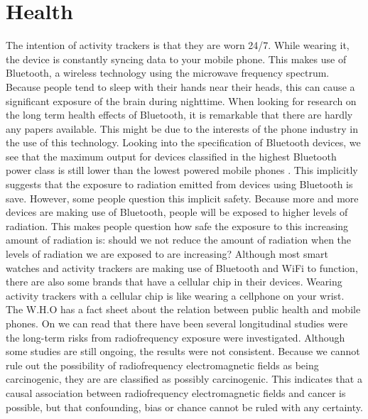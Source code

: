 \section{Health}
The intention of activity trackers is that they are worn 24/7. 
While wearing it, the device is constantly syncing data to your mobile phone.
This makes use of Bluetooth, a wireless technology using the microwave frequency spectrum.
Because people tend to sleep with their hands near their heads, this can cause a significant exposure of the brain during nighttime.
When looking for research on the long term health effects of Bluetooth, it is remarkable that there are hardly any papers available. 
This might be due to the interests of the phone industry in the use of this technology.
Looking into the specification of Bluetooth devices, we see that the maximum output for devices classified in the highest Bluetooth power class is still lower than the lowest powered mobile phones \cite{hietanen2005occupational}.
This implicitly suggests that the exposure to radiation emitted from devices using Bluetooth is save. 
However, some people question this implicit safety.
Because more and more devices are making use of Bluetooth, people will be exposed to higher levels of radiation. 
This makes people question how safe the exposure to this increasing amount of radiation is: should we not reduce the amount of radiation when the levels of radiation we are exposed to are increasing?
Although most smart watches and activity trackers are making use of Bluetooth and WiFi to function, there are also some brands that have a cellular chip in their devices.
Wearing activity trackers with a cellular chip is like wearing a cellphone on your wrist.
The W.H.O has a fact sheet about the relation between public health and mobile phones. 
On \cite{who2014mobilephones} we can read that there have been several longitudinal studies were the long-term risks from radiofrequency exposure were investigated.
Although some studies are still ongoing, the results were not consistent.
Because we cannot rule out the possibility of radiofrequency electromagnetic fields as being carcinogenic, they are are classified as possibly carcinogenic.
This indicates that a causal association between radiofrequency electromagnetic fields and cancer is possible, but that confounding, bias or chance cannot be ruled with any certainty.